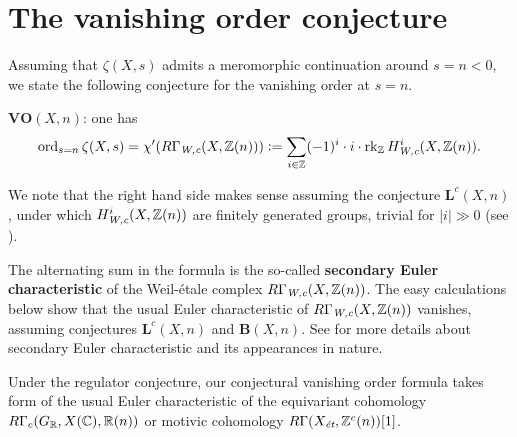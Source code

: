 \documentclass{article}
\numberwithin{equation}{section}
\begin{document}

\section{The vanishing order conjecture}
\label{sec:vanishing-order-conjecture}

Assuming that $\zeta (X,s)$ admits a meromorphic continuation around
$s = n < 0$, we state the following conjecture for the vanishing order at
$s = n$.

\begin{conjecture}
  $\mathbf{VO} (X,n)$: one has
  \[ \ord_{s=n} \zeta (X,s) =
    \chi' (R\Gamma_\Wc (X, \ZZ (n))) \dfn
    \sum_{i \in \ZZ} (-1)^i \cdot i \cdot \rk_\ZZ H^i_\Wc (X, \ZZ (n)). \]
\end{conjecture}

We note that the right hand side makes sense assuming the conjecture
$\mathbf{L}^c (X,n)$, under which $H^i_\Wc (X, \ZZ (n))$ are finitely generated
groups, trivial for $|i| \gg 0$
(see \cite[Proposition~7.7]{Beshenov-Weil-etale-1}).

\begin{remark}
  The alternating sum in the formula is the so-called
  \textbf{secondary Euler characteristic} of the Weil-étale complex
  $R\Gamma_\Wc (X, \ZZ (n))$.  The easy calculations below show that the usual
  Euler characteristic of $R\Gamma_\Wc (X, \ZZ (n))$ vanishes, assuming
  conjectures $\mathbf{L}^c (X,n)$ and $\mathbf{B} (X,n)$. See
  \cite{Ramachandran-2016} for more details about secondary Euler characteristic
  and its appearances in nature.
\end{remark}

Under the regulator conjecture, our conjectural vanishing order formula takes
form of the usual Euler characteristic of the equivariant cohomology
$R\Gamma_c (G_\RR, X(\CC), \RR (n))$ or motivic cohomology
$R\Gamma (X_\et, \ZZ^c (n)) [1]$.
\end{document}
